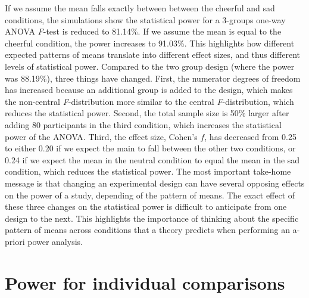 \documentclass[
  ,jou,floatsintext]{apa6}
\begin{document}
If we assume the mean falls exactly between between the cheerful and sad conditions, the simulations show the statistical power for a 3-groups one-way ANOVA \emph{F}-test is reduced to 81.14\%.
If we assume the mean is equal to the cheerful condition, the power increases to 91.03\%.
This highlights how different expected patterns of means translate into different effect sizes, and thus different levels of statistical power.
Compared to the two group design (where the power was 88.19\%), three things have changed.
First, the numerator degrees of freedom has increased because an additional group is added to the design, which makes the non-central \emph{F}-distribution more similar to the central \emph{F}-distribution, which reduces the statistical power.
Second, the total sample size is 50\% larger after adding 80 participants in the third condition, which increases the statistical power of the ANOVA.
Third, the effect size, Cohen's \(f\), has decreased from 0.25 to either 0.20 if we expect the main to fall between the other two conditions, or 0.24 if we expect the mean in the neutral condition to equal the mean in the sad condition, which reduces the statistical power.
The most important take-home message is that changing an experimental design can have several opposing effects on the power of a study, depending of the pattern of means.
The exact effect of these three changes on the statistical power is difficult to anticipate from one design to the next.
This highlights the importance of thinking about the specific pattern of means across conditions that a theory predicts when performing an a-priori power analysis.

\hypertarget{power-for-individual-comparisons}{%
\section{Power for individual comparisons}\label{power-for-individual-comparisons}}
\end{document}
